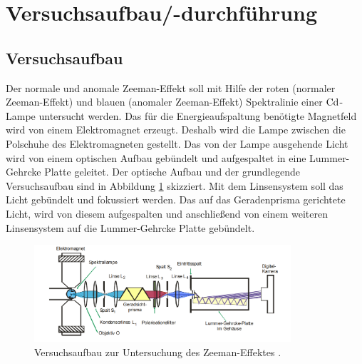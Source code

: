 \section{Versuchsaufbau/-durchführung}

\subsection{Versuchsaufbau}

Der normale und anomale Zeeman-Effekt soll mit Hilfe der roten (normaler Zeeman-Effekt)
und blauen (anomaler Zeeman-Effekt) Spektralinie einer $\ce{Cd}$-Lampe untersucht werden.
Das für die Energieaufspaltung benötigte Magnetfeld wird von einem Elektromagnet erzeugt.
Deshalb wird die Lampe zwischen die Polschuhe des Elektromagneten gestellt.
Das von der Lampe ausgehende Licht wird von einem optischen Aufbau gebündelt und aufgespaltet
in eine Lummer-Gehrcke Platte geleitet. Der optische Aufbau und der grundlegende Versuchsaufbau
sind in Abbildung \ref{fig: versuchsaufbau} skizziert.
Mit dem Linsensystem soll das Licht gebündelt und fokussiert werden.
Das auf das Geradenprisma gerichtete Licht, wird von diesem aufgespalten und anschließend von einem
weiteren Linsensystem auf die Lummer-Gehrcke Platte gebündelt.
\FloatBarrier
\begin{figure}[h]
  \centering
  \includegraphics[width=0.85\textwidth]{pics/versuchsaufbau.png}
  \caption{Versuchsaufbau zur Untersuchung des Zeeman-Effektes \cite{anleitung27}.}
  \label{fig: versuchsaufbau}
\end{figure}
\FloatBarrier

